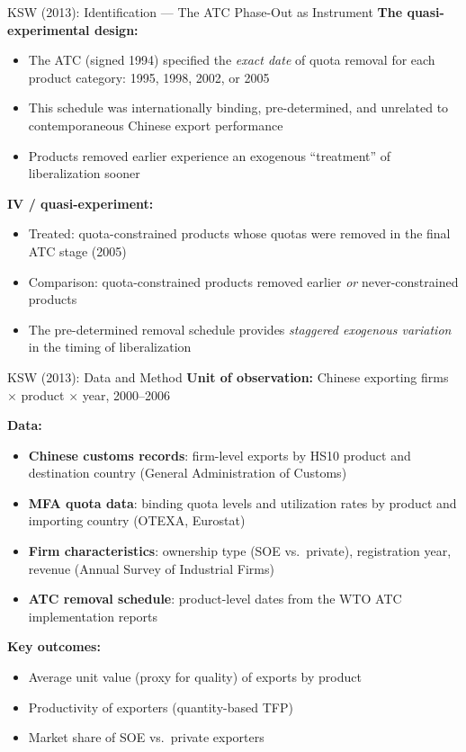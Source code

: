 \documentclass{beamer}
\begin{document}
\begin{frame}{KSW (2013): Identification --- The ATC Phase-Out as Instrument}
\textbf{The quasi-experimental design:}
\begin{itemize}
  \item The ATC (signed 1994) specified the \emph{exact date} of quota
        removal for each product category: 1995, 1998, 2002, or 2005
  \item This schedule was internationally binding, pre-determined, and
        unrelated to contemporaneous Chinese export performance
  \item Products removed earlier experience an exogenous ``treatment''
        of liberalization sooner
\end{itemize}

\medskip
\textbf{IV / quasi-experiment:}
\begin{itemize}
  \item Treated: quota-constrained products whose quotas were removed
        in the final ATC stage (2005)
  \item Comparison: quota-constrained products removed earlier
        \emph{or} never-constrained products
  \item The pre-determined removal schedule provides \emph{staggered
        exogenous variation} in the timing of liberalization
\end{itemize}
\end{frame}

\begin{frame}{KSW (2013): Data and Method}
\textbf{Unit of observation:} Chinese exporting firms $\times$ product
$\times$ year, 2000--2006

\medskip
\textbf{Data:}
\begin{itemize}
  \item \textbf{Chinese customs records}: firm-level exports by HS10
        product and destination country (General Administration of Customs)
  \item \textbf{MFA quota data}: binding quota levels and utilization
        rates by product and importing country (OTEXA, Eurostat)
  \item \textbf{Firm characteristics}: ownership type (SOE vs.\ private),
        registration year, revenue (Annual Survey of Industrial Firms)
  \item \textbf{ATC removal schedule}: product-level dates from the WTO
        ATC implementation reports
\end{itemize}

\medskip
\textbf{Key outcomes:}
\begin{itemize}
  \item Average unit value (proxy for quality) of exports by product
  \item Productivity of exporters (quantity-based TFP)
  \item Market share of SOE vs.\ private exporters
\end{itemize}
\end{frame}
\end{document}
